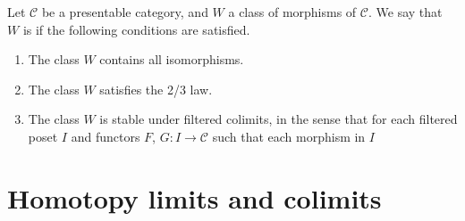 \documentclass[main.tex]{subfiles}
\begin{document}
\begin{definition}
  \label{def:perfect_class_of_morphisms}
  Let $\mathcal{C}$ be a presentable category, and $W$ a class of morphisms of $\mathcal{C}$. We say that $W$ is  if the following conditions are satisfied.
  \begin{enumerate}
    \item The class $W$ contains all isomorphisms.

    \item The class $W$ satisfies the 2/3 law. 

    \item The class $W$ is stable under filtered colimits, in the sense that for each filtered poset $I$ and functors $F$, $G\colon I \to \mathcal{C}$ such that each morphism in $I$
  \end{enumerate}
\end{definition}

\section{Homotopy limits and colimits}
\label{sec:homotopy_limits_and_colimits}
\end{document}
